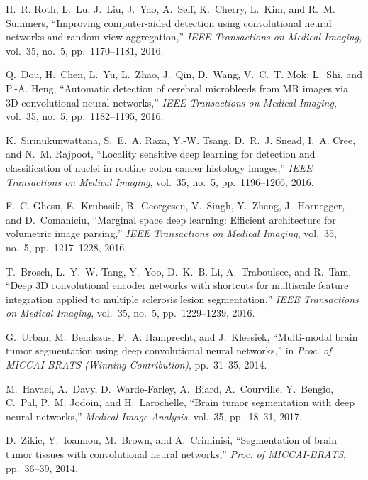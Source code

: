 \documentclass[journal,twocolumn]{IEEEtran}
\begin{document}
\begin{thebibliography}{10}
H.~R. Roth, L.~Lu, J.~Liu, J.~Yao, A.~Seff, K.~Cherry, L.~Kim, and R.~M.
  Summers, ``{Improving computer-aided detection using convolutional neural
  networks and random view aggregation},'' {\em IEEE Transactions on Medical
  Imaging}, vol.~35, no.~5, pp.~1170--1181, 2016.

Q.~Dou, H.~Chen, L.~Yu, L.~Zhao, J.~Qin, D.~Wang, V.~C.~T. Mok, L.~Shi, and
  P.-A. Heng, ``{Automatic detection of cerebral microbleeds from MR images via
  3D convolutional neural networks},'' {\em IEEE Transactions on Medical
  Imaging}, vol.~35, no.~5, pp.~1182--1195, 2016.

K.~Sirinukunwattana, S.~E.~A. Raza, Y.-W. Tsang, D.~R.~J. Snead, I.~A. Cree,
  and N.~M. Rajpoot, ``{Locality sensitive deep learning for detection and
  classification of nuclei in routine colon cancer histology images},'' {\em
  IEEE Transactions on Medical Imaging}, vol.~35, no.~5, pp.~1196--1206, 2016.

F.~C. Ghesu, E.~Krubasik, B.~Georgescu, V.~Singh, Y.~Zheng, J.~Hornegger, and
  D.~Comaniciu, ``{Marginal space deep learning: Efficient architecture for
  volumetric image parsing},'' {\em IEEE Transactions on Medical Imaging},
  vol.~35, no.~5, pp.~1217--1228, 2016.

T.~Brosch, L.~Y.~W. Tang, Y.~Yoo, D.~K.~B. Li, A.~Traboulsee, and R.~Tam,
  ``{Deep 3D convolutional encoder networks with shortcuts for multiscale
  feature integration applied to multiple sclerosis lesion segmentation},''
  {\em IEEE Transactions on Medical Imaging}, vol.~35, no.~5, pp.~1229--1239,
  2016.

G.~Urban, M.~Bendszus, F.~A. Hamprecht, and J.~Kleesiek, ``{Multi-modal brain
  tumor segmentation using deep convolutional neural networks},'' in {\em Proc.
  of MICCAI-BRATS (Winning Contribution)}, pp.~31--35, 2014.

M.~Havaei, A.~Davy, D.~Warde-Farley, A.~Biard, A.~Courville, Y.~Bengio, C.~Pal,
  P.~M. Jodoin, and H.~Larochelle, ``Brain tumor segmentation with deep neural
  networks,'' {\em Medical Image Analysis}, vol.~35, pp.~18--31, 2017.

D.~Zikic, Y.~Ioannou, M.~Brown, and A.~Criminisi, ``{Segmentation of brain
  tumor tissues with convolutional neural networks},'' {\em Proc. of
  MICCAI-BRATS}, pp.~36--39, 2014.


\end{thebibliography}
\end{document}
